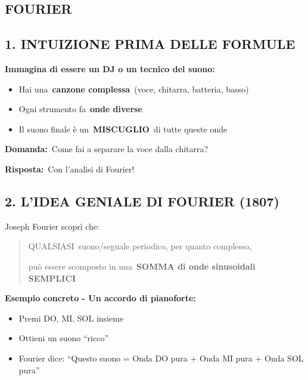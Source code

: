 \documentclass[
]{article}
\providecommand{\tightlist}{%
  \setlength{\itemsep}{0pt}\setlength{\parskip}{0pt}}
\begin{document}
\hypertarget{fourier}{%
\subsection{FOURIER}\label{fourier}}

\hypertarget{intuizione-prima-delle-formule}{%
\subsection{\texorpdfstring{\textbf{1. INTUIZIONE PRIMA DELLE FORMULE}}{1. INTUIZIONE PRIMA DELLE FORMULE}}\label{intuizione-prima-delle-formule}}

\textbf{Immagina di essere un DJ o un tecnico del suono:}

\begin{itemize}
\tightlist
\item
  Hai una~\textbf{canzone complessa}~(voce, chitarra, batteria, basso)
\item
  Ogni strumento fa~\textbf{onde diverse}
\item
  Il suono finale è un~\textbf{MISCUGLIO}~di tutte queste onde
\end{itemize}

\textbf{Domanda:}~Come fai a separare la voce dalla chitarra?

\textbf{Risposta:}~Con l'analisi di Fourier!

\hypertarget{lidea-geniale-di-fourier-1807}{%
\subsection{\texorpdfstring{\textbf{2. L'IDEA GENIALE DI FOURIER (1807)}}{2. L'IDEA GENIALE DI FOURIER (1807)}}\label{lidea-geniale-di-fourier-1807}}

Joseph Fourier scoprì che:

\begin{quote}
QUALSIASI~suono/seguale periodico, per quanto complesso,

può essere scomposto in una~\textbf{SOMMA di onde sinusoidali SEMPLICI}
\end{quote}

\textbf{Esempio concreto - Un accordo di pianoforte:}

\begin{itemize}
\tightlist
\item
  Premi DO, MI, SOL insieme
\item
  Ottieni un suono ``ricco''
\item
  Fourier dice: ``Questo suono = Onda DO pura + Onda MI pura + Onda SOL pura''
\end{itemize}
\end{document}
